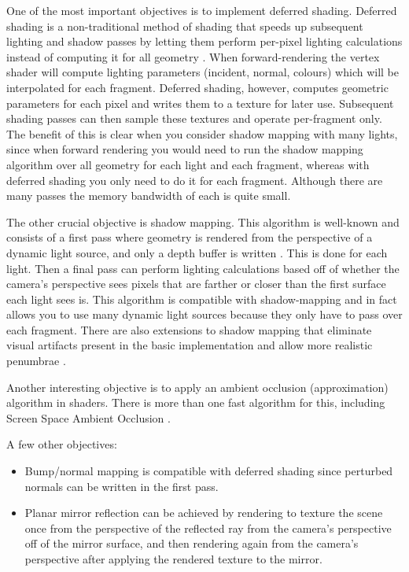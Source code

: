 \documentclass {article}
\begin{document}
\begin{description}
    One of the most important objectives is to implement deferred shading. Deferred shading is a non-traditional method of shading that speeds up subsequent lighting and shadow passes by letting them perform per-pixel lighting calculations instead of computing it for all geometry \cite{ferkoreal}.
    When forward-rendering the vertex shader will compute lighting parameters (incident, normal, colours) which will be interpolated for each fragment. Deferred shading, however, computes geometric parameters for each pixel and writes them to a texture for later use. Subsequent shading passes can then sample these textures and operate per-fragment only. The benefit of this is clear when you consider shadow mapping with many lights, since when forward rendering you would need to run the shadow mapping algorithm over all geometry for each light and each fragment, whereas with deferred shading you only need to do it for each fragment. Although there are many passes the memory bandwidth of each is quite small.

    The other crucial objective is shadow mapping. This algorithm is well-known and consists of a first pass where geometry is rendered from the perspective of a dynamic light source, and only a depth buffer is written \cite{williams1978casting}. This is done for each light. Then a final pass can perform lighting calculations based off of whether the camera's perspective sees pixels that are farther or closer than the first surface each light sees is. This algorithm is compatible with shadow-mapping and in fact allows you to use many dynamic light sources because they only have to pass over each fragment. There are also extensions to shadow mapping that eliminate visual artifacts present in the basic implementation and allow more realistic penumbrae \cite{dimitrov2007cascaded} \cite{fernando2005percentage}.

    Another interesting objective is to apply an ambient occlusion (approximation) algorithm in shaders. There is more than one fast algorithm for this, including Screen Space Ambient Occlusion \cite{kajalinshaderx7}\cite{mittring2007finding}.

    A few other objectives:
    \begin{itemize}
      \item
        Bump/normal mapping is compatible with deferred shading since perturbed normals can be written in the first pass.

      \item
        Planar mirror reflection can be achieved by rendering to texture the scene once from the perspective of the reflected ray from the camera's perspective off of the mirror surface, and then rendering again from the camera's perspective after applying the rendered texture to the mirror.


\end{itemize}
\end{description}
\end{document}
